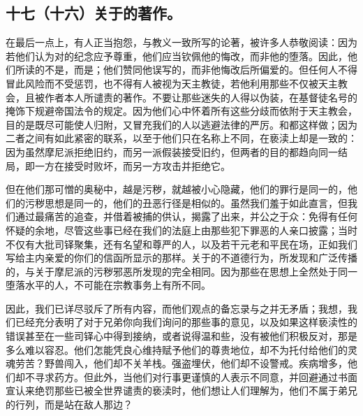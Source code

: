 
\subsection{十七（十六）关于的著作。}

在最后一点上，有人正当抱怨，与教义一致所写的论著，被许多人恭敬阅读：因为若他们认为对的纪念应予尊重，他们应当钦佩他的悔改，而非他的堕落。因此，他们所读的不是，而是；他们赞同他误写的，而非他悔改后所偏爱的。但任何人不得冒此风险而不受惩罚，也不得有人被视为天主教徒，若他利用那些不仅被天主教会，且被作者本人所谴责的著作。不要让那些迷失的人得以伪装，在基督徒名号的掩饰下规避帝国法令的规定。因为他们心中怀着所有这些分歧而依附于天主教会，目的是既尽可能使人归附，又冒充我们的人以逃避法律的严厉。和都这样做；因为二者之间有如此紧密的联系，以至于他们只在名称上不同，在亵渎上却是一致的：因为虽然摩尼派拒绝旧约，而另一派假装接受旧约，但两者的目的都趋向同一结局，即一方在接受时败坏，而另一方攻击并拒绝它。\par

但在他们那可憎的奥秘中，越是污秽，就越被小心隐藏，他们的罪行是同一的，他们的污秽思想是同一的，他们的丑恶行径是相似的。虽然我们羞于如此直言，但我们通过最痛苦的追查，并借着被捕的供认，揭露了出来，并公之于众：免得有任何怀疑的余地，尽管这些事已经在我们的法庭上由那些犯下罪恶的人亲口披露；当时不仅有大批司铎聚集，还有名望和尊严的人，以及若干元老和平民在场，正如我们写给主内亲爱的你们的信函所显示的那样。关于的不道德行为，所发现和广泛传播的，与关于摩尼派的污秽邪恶所发现的完全相同。因为那些在思想上全然处于同一堕落水平的人，不可能在宗教事务上有所不同。\par

因此，我们已详尽驳斥了所有内容，而他们观点的备忘录与之并无矛盾；我想，我们已经充分表明了对于兄弟你向我们询问的那些事的意见，以及如果这样亵渎性的错误甚至在一些司铎心中得到接纳，或者说得温和些，没有被他们积极反对，那是多么难以容忍。他们怎能凭良心维持赋予他们的尊贵地位，却不为托付给他们的灵魂劳苦？野兽闯入，他们却不关羊栈。强盗埋伏，他们却不设警戒。疾病增多，他们却不寻求药方。但此外，当他们对行事更谨慎的人表示不同意，并回避通过书面宣认来绝罚那些已被全世界谴责的亵渎时，他们想让人们理解为，他们不属于弟兄的行列，而是站在敌人那边？\par


